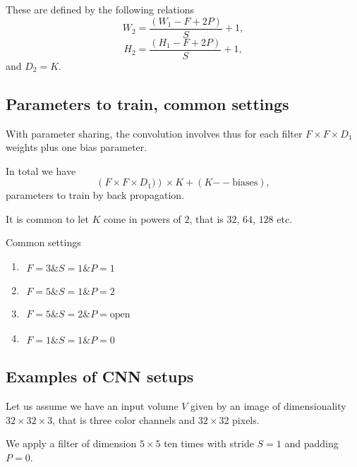 \documentclass[%
oneside,                 %
final,                   %
10pt]{article}
\begin{document}
These are defined by the following relations
\[
W_2 = \frac{(W_1-F+2P)}{S}+1,
\]
\[
H_2 = \frac{(H_1-F+2P)}{S}+1,
\]
and $D_2=K$.

\subsection{Parameters to train, common settings}

With parameter sharing, the convolution involves thus  for each filter  $F\times F\times D_1$ weights plus one bias parameter.

In total we have
\[
\left(F\times F\times D_1)\right) \times K+(K\mathrm{--biases}),
\]
parameters to train by back propagation.

It is common to let $K$ come in powers of $2$, that is $32$, $64$, $128$ etc.

\begin{block}{Common settings }
\begin{enumerate}
\item $\begin{array}{c} F=3 {\&} S=1 {\&} P=1 \end{array}$

\item $\begin{array}{c} F=5 {\&} S=1 {\&} P=2 \end{array}$

\item $\begin{array}{c} F=5 {\&} S=2 {\&} P=\mathrm{open} \end{array}$

\item $\begin{array}{c} F=1 {\&} S=1 {\&} P=0 \end{array}$
\end{enumerate}

\noindent
\end{block}

\subsection{Examples of CNN setups}

Let us assume we have an input volume $V$ given by an image of dimensionality
$32\times 32 \times 3$, that is three color channels and $32\times 32$ pixels.

We apply a filter of dimension $5\times 5$ ten times with stride $S=1$ and padding $P=0$.
\end{document}
